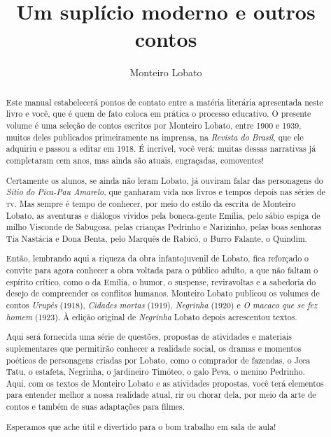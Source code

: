 \documentclass[11pt]{extarticle}
\begin{document}
\newcommand{\AutorLivro}{Monteiro Lobato}
\newcommand{\TituloLivro}{Um suplício moderno e outros contos}
\newcommand{\Tema}{Ficção, mistério e fantasia}
\newcommand{\Genero}{Conto, crônica e novela}
\newcommand{\imagemCapa}{./images/PNLD0024-01.png}
\newcommand{\issnppub}{978-65-86974-20-1 }
\newcommand{\issnepub}{978-65-86974-21-8}
\newcommand{\colaborador}{{Ieda Lebensztayn}}


\title{\TituloLivro}
\author{\AutorLivro}
\def\authornotes{\colaborador}

\date{}
\maketitle

\begin{abstract}

Este manual estabelecerá pontos de contato entre a matéria literária
apresentada neste livro e você, que é quem de fato coloca em prática o
processo educativo. O presente volume é uma seleção de contos escritos
por Monteiro Lobato, entre 1900 e 1939, muitos deles publicados
primeiramente na imprensa, na \emph{Revista do Brasil}, que ele adquiriu
e passou a editar em 1918. É incrível, você verá: muitas dessas
narrativas já completaram cem anos, mas ainda são atuais, engraçadas,
comoventes!

Certamente os alunos, se ainda não leram Lobato, já ouviram falar das
personagens do \emph{Sítio do Pica-Pau Amarelo}, que ganharam vida nos
livros e tempos depois nas séries de \textsc{tv}. Mas sempre é tempo de conhecer,
por meio do estilo da escrita de Monteiro Lobato, as aventuras e
diálogos vividos pela boneca-gente Emília, pelo sábio espiga de milho
Visconde de Sabugosa, pelas crianças Pedrinho e Narizinho, pelas boas
senhoras Tia Nastácia e Dona Benta, pelo Marquês de Rabicó, o Burro
Falante, o Quindim.

Então, lembrando aqui a riqueza da obra infantojuvenil de Lobato, fica
reforçado o convite para agora conhecer a obra voltada para o público
adulto, a que não faltam o espírito crítico, como o da Emília, o humor,
o suspense, reviravoltas e a sabedoria do desejo de compreender os
conflitos humanos. Monteiro Lobato publicou os volumes de contos
\emph{Urupês} (1918), \emph{Cidades mortas} (1919), \emph{Negrinha}
(1920) e \emph{O macaco que se fez homem} (1923). À edição original de
\emph{Negrinha} Lobato depois acrescentou textos.

Aqui será fornecida uma série de questões, propostas de atividades e
materiais suplementares que permitirão conhecer a realidade social, os
dramas e momentos poéticos de personagens criadas por Lobato, como o
comprador de fazendas, o Jeca Tatu, o estafeta, Negrinha, o jardineiro
Timóteo, o galo Peva, o menino Pedrinho. Aqui, com os textos de Monteiro
Lobato e as atividades propostas, você terá elementos para entender
melhor a nossa realidade atual, rir ou chorar dela, por meio da arte de
contos e também de suas adaptações para filmes.

Esperamos que ache útil e divertido para o bom trabalho em sala de aula!
\end{abstract}
\end{document}
